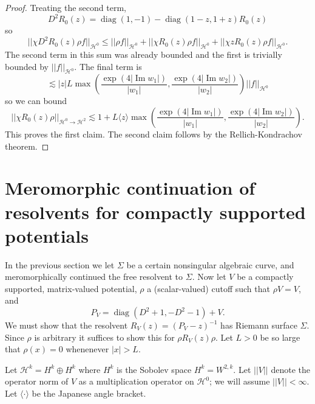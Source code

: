 \documentclass[12pt]{report}
\DeclareMathOperator{\diag}{diag}
\renewcommand{\Im}{\operatorname{Im}}
\theoremstyle{definition}
\begin{document}
\begin{proof}
Treating the second term,
$$D^2R_0(z) = \diag(1, - 1) - \diag(1-z,1+z)R_0(z)$$
so
$$||\chi D^2 R_0(z) \rho f||_{\mathcal H^0} \leq ||\rho f||_{\mathcal H^0} + ||\chi R_0(z) \rho f||_{\mathcal H^0} + ||\chi z R_0(z) \rho f||_{\mathcal H^0}.$$
The second term in this sum was already bounded and the first is trivially bounded by $||f||_{\mathcal H^0}$.
The final term is
$$\lesssim |z|L \max\left(\frac{\exp(4 |\Im w_1|)}{|w_1|}, \frac{\exp(4 |\Im w_2|)}{|w_2|} \right) ||f||_{\mathcal H^0}$$
so we can bound
$$||\chi R_0(z) \rho||_{\mathcal H^0 \to \mathcal H^2} \lesssim 1 + L\langle z\rangle\max\left(\frac{\exp(4 |\Im w_1|)}{|w_1|}, \frac{\exp(4 |\Im w_2|)}{|w_2|} \right).$$
This proves the first claim.
The second claim follows by the Rellich-Kondrachov theorem.
\end{proof}

\section{Meromorphic continuation of resolvents for compactly supported potentials}
In the previous section we let $\Sigma$ be a certain nonsingular algebraic curve, and meromorphically continued the free resolvent to $\Sigma$.
Now let $V$ be a compactly supported, matrix-valued potential, $\rho$ a (scalar-valued) cutoff such that $\rho V = V$, and
$$P_V = \diag(D^2 + 1, -D^2 - 1) + V.$$
We must show that the resolvent $R_V(z) = (P_V - z)^{-1}$ has Riemann surface $\Sigma$.
Since $\rho$ is arbitrary it suffices to show this for $\rho R_V(z) \rho$.
Let $L > 0$ be so large that $\rho(x) = 0$ whenenever $|x| > L$.

Let $\mathcal H^k = H^k \oplus H^k$ where $H^k$ is the Sobolev space $H^k = W^{2,k}$.
Let $||V||$ denote the operator norm of $V$ as a multiplication operator on $\mathcal H^0$; we will assume $||V|| < \infty$.
Let $\langle\cdot\rangle$ be the Japanese angle bracket.
\end{document}
